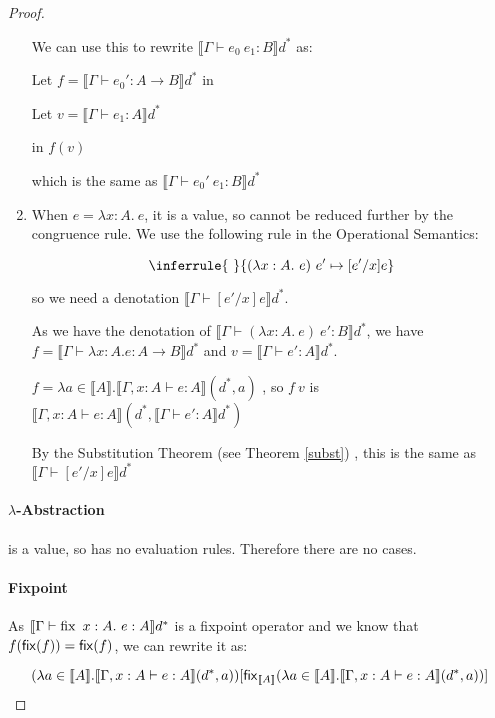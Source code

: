 \begin{proof}
\begin{enumerate}
{We can use this to rewrite $\llbracket \Gamma \vdash e_0 \ e_1 : B \rrbracket d^*$ as:

Let $f = \llbracket \Gamma \vdash e_0' : A \to B \rrbracket d^*$ in 

\hspace{4.5cm} Let $v = \llbracket \Gamma \vdash e_1 : A \rrbracket d^*$ 

\hspace{7cm} in $f(v)$

which is the same as $\llbracket \Gamma \vdash e_0' \ e_1 : B \rrbracket d^*$
}
\item{When $e = \lambda x:A. \ e$, it is a value, so cannot be reduced further by the congruence rule. We use the following rule in the Operational Semantics:

$$
\inferrule{ \ }
 {(\lambda x: A .\ e) \ e' \mapsto [e'/x]e}
$$

so we need a denotation $\llbracket \Gamma \vdash [e'/x]e \rrbracket d^*$.

As we have the denotation of $\llbracket \Gamma \vdash (\lambda x:A. \ e) \ e' : B \rrbracket d^*$, we have $f = \llbracket \Gamma \vdash \lambda x:A. e : A \to B \rrbracket d^*$ and $v = \llbracket \Gamma \vdash e': A  \rrbracket d^*.$

$f = \lambda a \in \llbracket A \rrbracket . \llbracket \Gamma, x : A \vdash e : A \rrbracket(d^*, a)$ , so $f \ v$ is $\llbracket \Gamma, x : A \vdash e : A \rrbracket(d^*, \llbracket \Gamma \vdash e' : A \rrbracket d^*)$

By the Substitution Theorem (see Theorem \ref{subst}) , this is the same as $\llbracket \Gamma \vdash [e'/x]e \rrbracket d^*$}
\end{enumerate}

\paragraph{$\lambda$-Abstraction}  is a value, so has no evaluation rules. Therefore there are no cases.

\paragraph{Fixpoint} As $\llbracket \Gamma \vdash \fix \ x:A . \ e : A \rrbracket d^*$ is a fixpoint operator and we know that $f(\operatorname{\mathsf{fix}}(f)) = \operatorname{\mathsf{fix}}(f)$, we can rewrite it as:

\[(\lambda a \in \llbracket A \rrbracket . \llbracket \Gamma, x : A \vdash e : A \rrbracket(d^*, a))[\operatorname{\mathsf{fix}}_{\llbracket A \rrbracket} (\lambda a \in \llbracket A \rrbracket . \llbracket \Gamma, x : A \vdash e : A \rrbracket(d^*, a))]\]


\end{proof}
